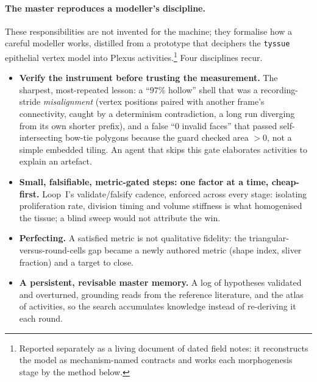 \documentclass[11pt]{article}
\begin{document}
\paragraph{The master reproduces a modeller's discipline.}
These responsibilities are not invented for the machine; they formalise how a careful
modeller works, distilled from a prototype that deciphers the \texttt{tyssue} epithelial
vertex model into Plexus activities.\footnote{Reported separately as a living document of
dated field notes: it reconstructs the model as mechanism-named contracts and works each
morphogenesis stage by the method below.} Four disciplines recur.
\begin{itemize}
\item \textbf{Verify the instrument before trusting the measurement.} The sharpest,
most-repeated lesson: a ``$97\%$ hollow'' shell that was a recording-stride \emph{misalignment}
(vertex positions paired with another frame's connectivity, caught by a determinism
contradiction, a long run diverging from its own shorter prefix), and a false
``$0$ invalid faces'' that passed self-intersecting bow-tie polygons because the guard checked
area $> 0$, not a simple embedded tiling. An agent that skips this gate elaborates activities
to explain an artefact.
\item \textbf{Small, falsifiable, metric-gated steps: one factor at a time, cheap-first.}
Loop~I's validate/falsify cadence, enforced across every stage: isolating proliferation rate,
division timing and volume stiffness is what homogenised the tissue; a blind sweep would not
attribute the win.
\item \textbf{Perfecting.} A satisfied metric is not qualitative fidelity: the
triangular-versus-round-cells gap became a newly authored metric (shape index, sliver
fraction) and a target to close.
\item \textbf{A persistent, revisable master memory.} A log of hypotheses validated and
overturned, grounding reads from the reference literature, and the atlas of activities, so the
search accumulates knowledge instead of re-deriving it each round.
\end{itemize}
\end{document}
